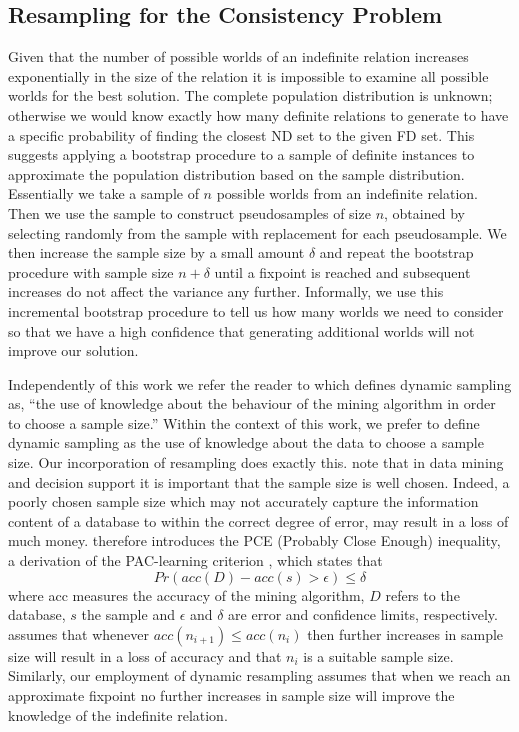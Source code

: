 \subsection{Resampling for the Consistency Problem}
Given that the number of  possible worlds of an indefinite relation increases
exponentially in the size of the relation  it is impossible to
examine all possible worlds for the best solution.  The
complete population distribution is unknown; otherwise we would know 
exactly how many definite relations to
generate to have a specific probability of finding the closest ND set
to the given FD set.  This suggests 
applying a bootstrap procedure to a sample of definite instances 
to approximate the population distribution based on the sample
distribution.  Essentially we take a sample of
$n$ possible
worlds from an indefinite relation. Then we use the sample
to construct pseudosamples of size $n$, obtained by selecting
randomly from the sample with replacement for each pseudosample. 
We then increase the sample size by a small amount $\delta$ and repeat
the bootstrap procedure with sample size $n + \delta$ until a fixpoint
is reached and subsequent increases do not affect the variance any further.
Informally, we use this incremental
bootstrap procedure to tell us how many worlds we need 
to consider so that we have a high confidence that generating additional
worlds will not improve our solution.

\medskip

Independently of this work we refer the reader to \cite{jl96} which
defines dynamic sampling as, ``the use of knowledge about the
behaviour of the mining algorithm in order to choose a sample size.''
Within the context of this work, we prefer to define dynamic sampling
as the use of knowledge about the data to choose a sample size. Our
incorporation of resampling does exactly this.
\cite{jl96} note that in data mining and decision support it is
important that the sample size is well chosen.  Indeed, a poorly
chosen sample size which may not accurately capture the information
content of a database to within the correct degree of error, may
result in a loss of much money. \cite{jl96} therefore introduces the
PCE (Probably Close Enough) inequality, a derivation of the
PAC-learning criterion \cite{val84,ab92}, which states that
\[
Pr(acc(D) - acc(s) > \epsilon) \le \delta
\]
where acc measures the accuracy of the mining algorithm, $D$ refers to
the database, $s$ the sample and $\epsilon$ and $\delta$ are error and
confidence limits, respectively. \cite{jl96} assumes that whenever
$acc(n_{i+1}) \le acc(n_i)$ 
then further increases in sample size will result in a loss of
accuracy and that $n_i$ is a suitable sample size. Similarly, our
employment of dynamic resampling assumes that when we reach an
approximate fixpoint no further increases in sample size will improve
the knowledge of the indefinite relation. 

